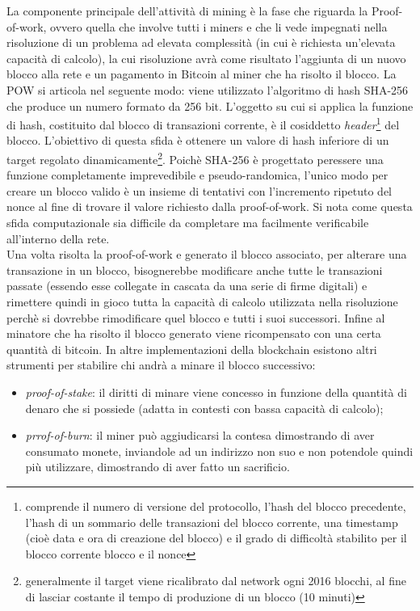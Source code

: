 La componente principale dell'attività di mining è la fase che riguarda la Proof-of-work, ovvero quella che involve tutti i miners e che li vede impegnati nella risoluzione di un problema ad elevata complessità (in cui è richiesta un'elevata capacità di calcolo), la cui risoluzione avrà come risultato l'aggiunta di un nuovo blocco alla rete e un pagamento in Bitcoin al miner che ha risolto il blocco. La POW si articola nel seguente modo: viene utilizzato l'algoritmo di hash SHA-256 che produce un numero formato da 256 bit. L'oggetto su cui si applica la funzione di hash, costituito dal blocco di transazioni corrente, è il cosiddetto \emph{header}\footnote{comprende il numero di versione del protocollo, l’hash del blocco precedente, l’hash di un sommario delle transazioni del blocco corrente, una timestamp (cioè data e ora di creazione del blocco) e il grado di difficoltà stabilito per il blocco corrente blocco e il nonce} del blocco. L'obiettivo di questa sfida è ottenere un valore di hash inferiore di un target regolato dinamicamente\footnote{generalmente il target viene ricalibrato dal network ogni 2016 blocchi, al fine di lasciar costante il tempo di produzione di un blocco (10 minuti)}. Poichè SHA-256 è progettato peressere una funzione completamente imprevedibile e pseudo-randomica, l'unico modo per creare un blocco valido è un insieme di tentativi con l'incremento ripetuto del nonce al fine di trovare il valore richiesto dalla proof-of-work. Si nota come questa sfida computazionale sia difficile da completare ma facilmente verificabile all'interno della rete. \\
Una volta risolta la proof-of-work e generato il blocco associato, per alterare una transazione in un blocco, bisognerebbe modificare anche tutte le transazioni passate (essendo esse collegate in cascata da una serie di firme digitali) e rimettere quindi in gioco tutta la capacità di calcolo utilizzata nella risoluzione perchè si dovrebbe rimodificare quel blocco e tutti i suoi successori. Infine al minatore che ha risolto il blocco generato viene ricompensato con una certa quantità di bitcoin. In altre implementazioni della blockchain esistono altri strumenti per stabilire chi andrà a minare il blocco successivo:
\begin{itemize}
	\item \emph{proof-of-stake}: il diritti di minare viene concesso in funzione della quantità di denaro che si possiede (adatta in contesti con bassa capacità di calcolo);
	\item \emph{prrof-of-burn}: il miner può  aggiudicarsi la contesa dimostrando di aver consumato monete, inviandole ad un indirizzo non suo e non potendole quindi più utilizzare, dimostrando di aver fatto un sacrificio.
\end{itemize}
%
